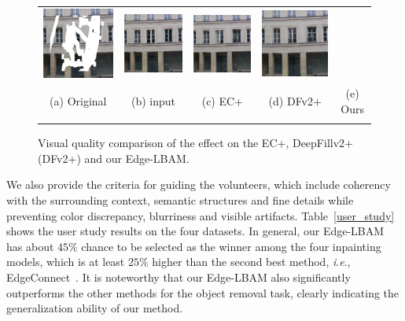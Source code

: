 \documentclass[10pt,journal,compsoc]{IEEEtran}
\newcommand{\ie}{\textit{i}.\textit{e}.}
\begin{document}
\begin{figure}[hbt]
\begin{tabular}{ccccc}
		\includegraphics[width=.18\linewidth]{compare_variants/input47-0}  &
		\includegraphics[width=.18\linewidth]{compare_variants/gc47-0}  &
		\includegraphics[width=.18\linewidth]{compare_variants/ec47-0}  &
		\includegraphics[width=.18\linewidth]{compare_variants/ours47-0}\\
		{\scriptsize{(a) Original}} & {\scriptsize{(b) input}} & {\scriptsize{(c) EC+}} &{\scriptsize{(d) DFv2+}}& {\scriptsize{(e) Ours}}\\
		\vspace{-2mm}
	\end{tabular}
	\caption{Visual quality comparison of the effect on the EC+, DeepFillv2+ (DFv2+) and our Edge-LBAM.}
	\label{fig:replace}
\end{figure}
%
We also provide the criteria for guiding the volunteers, which include coherency with the surrounding context, semantic structures and fine details while preventing color discrepancy, blurriness and visible artifacts.
%
Table~\ref{user_study} shows the user study results on the four datasets.
%
In general, our Edge-LBAM has about {$45\%$} chance to be selected as the winner among the four inpainting models, which is at least $25\%$ higher than the second best method, \ie, EdgeConnect~\cite{nazeri2019edgeconnect}.
%
It is noteworthy that our Edge-LBAM also significantly outperforms the other methods for the object removal task, clearly indicating the generalization ability of our method.
\end{document}

